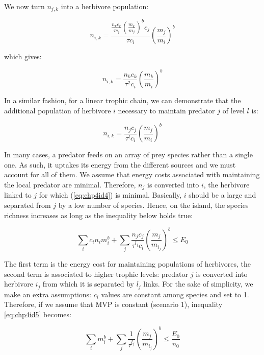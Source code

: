 We now turn \(n_{j,k}\) into a herbivore population:

\begin{equation} n_{i,k} = \frac{\frac{n_kc_k}{\tau c_j} \left( \frac{m_k}{m_j} \right)^bc_j}{\tau c_i} \left( \frac{m_j}{m_i} \right)^b \label{eq:chp4id3}\end{equation}

which gives:

\begin{equation} n_{i,k} = \frac{n_kc_k}{\tau^2 c_i} \left( \frac{m_k}{m_i} \right)^b \label{eq:chp4id3b}\end{equation}

In a similar fashion, for a linear trophic chain, we can demonstrate
that the additional population of herbivore \(i\) necessary to maintain
predator \(j\) of level \(l\) is:

\begin{equation} n_{i,k} = \frac{n_jc_j}{\tau^l c_i} \left( \frac{m_j}{m_i} \right)^b \label{eq:chp4id4}\end{equation}

In many cases, a predator feeds on an array of prey species rather than
a single one. As such, it uptakes its energy from the different sources
and we must account for all of them. We assume that energy costs
associated with maintaining the local predator are minimal. Therefore,
\(n_j\) is converted into \(i\), the herbivore linked to \(j\) for which
(\ref{eq:chp4id4}) is minimal. Basically, \(i\) should be a large and
separated from \(j\) by a low number of species. Hence, on the island,
the species richness increases as long as the inequality below holds
true:

\begin{equation} \sum_i c_in_im_i^b + \sum_j \frac{n_jc_j}{\tau^{l_j} c_i} \left( \frac{m_j}{m_{i_j}} \right)^b \leq E_0 \label{eq:chp4id5}\end{equation}

The first term is the energy cost for maintaining populations of
herbivores, the second term is associated to higher trophic levels:
predator \(j\) is converted into herbivore \(i_j\) from which it is
separated by \(l_j\) links. For the sake of simplicity, we make an extra
assumptions: \(c_i\) values are constant among species and set to 1.
Therefore, if we assume that MVP is constant (scenario 1), inequality
\ref{eq:chp4id5} becomes:

\begin{equation} \sum_i m_i^b + \sum_j \frac{1}{\tau^{l_j}} \left( \frac{m_j}{m_{i_j}} \right)^b \leq \frac{E_0}{n_0} \label{eq:chp4id5a}\end{equation}

